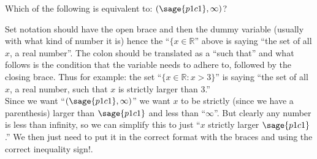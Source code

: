 \documentclass{ximera}
\begin{document}
\begin{problem}
    Which of the following is equivalent to: $(\sage{p1c1}, \infty)$?
    \begin{multipleChoice}
    \end{multipleChoice}
    
    \begin{feedback}
        Set notation should have the open brace and then the dummy variable (usually with what kind of number it is) hence the ``$\{x \in \mathbb{R}$'' above is saying ``the set of all $x$, a real number''. The colon should be translated as a ``such that'' and what follows is the condition that the variable needs to adhere to, followed by the closing brace. Thus for example: the set ``$\{x \in \mathbb{R}: x > 3\}$'' is saying ``the set of all $x$, a real number, such that $x$ is strictly larger than $3$.'' \\
        
        Since we want ``$(\sage{p1c1}, \infty)$'' we want $x$ to be strictly (since we have a parenthesis) larger than $\sage{p1c1}$ and less than ``$\infty$''. But clearly any number is less than infinity, so we can simplify this to just ``$x$ strictly larger $\sage{p1c1}$.'' We then just need to put it in the correct format with the braces and using the correct inequality sign!. 
    \end{feedback}
\end{problem}
\end{document}
